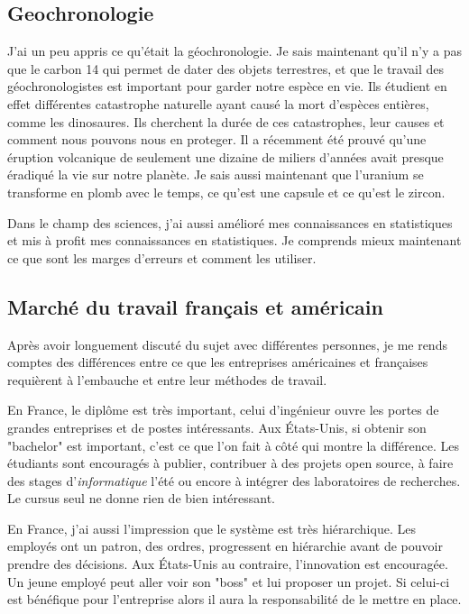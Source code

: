 \subsection{Geochronologie}
J'ai un peu appris ce qu'était la géochronologie. Je sais maintenant qu'il n'y a pas que le carbon 14 qui permet de dater des objets terrestres, et que le travail des géochronologistes est important pour garder notre espèce en vie. Ils étudient en effet différentes catastrophe naturelle ayant causé la mort d'espèces entières, comme les dinosaures. Ils cherchent la durée de ces catastrophes, leur causes et comment nous pouvons nous en proteger. Il a récemment été prouvé qu'une éruption volcanique de seulement une dizaine de miliers d'années avait presque éradiqué la vie sur notre planète.
Je sais aussi maintenant que l'uranium se transforme en plomb avec le temps, ce qu'est une capsule et ce qu'est le zircon.

Dans le champ des sciences, j'ai aussi amélioré mes connaissances en statistiques et mis à profit mes connaissances en statistiques. Je comprends mieux maintenant ce que sont les marges d'erreurs et comment les utiliser.

\subsection{Marché du travail français et américain}
Après avoir longuement discuté du sujet avec différentes personnes, je me rends comptes des différences entre ce que les entreprises américaines et françaises requièrent à l'embauche et entre leur méthodes de travail. 

En France, le diplôme est très important, celui d'ingénieur ouvre les portes de grandes entreprises et de postes intéressants. Aux États-Unis, si obtenir son "bachelor" est important, c'est ce que l'on fait à côté qui montre la différence. Les étudiants sont encouragés à publier, contribuer à des projets open source, à faire des stages d'\emph{informatique} l'été ou encore à intégrer des laboratoires de recherches. Le cursus seul ne donne rien de bien intéressant.

En France, j'ai aussi l'impression que le système est très hiérarchique. Les employés ont un patron, des ordres, progressent en hiérarchie avant de pouvoir prendre des décisions. Aux États-Unis au contraire, l'innovation est encouragée. Un jeune employé peut aller voir son "boss" et lui proposer un projet. Si celui-ci est bénéfique pour l'entreprise alors il aura la responsabilité de le mettre en place. 

